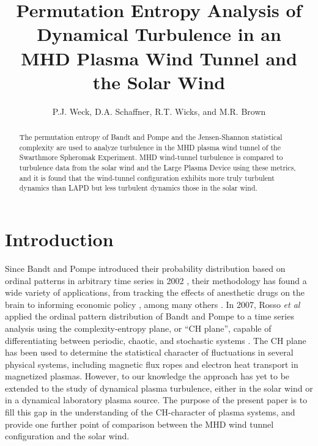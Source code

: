 \documentclass[aps,twocolumn,secnumarabic,nobalancelastpage,amsmath,amssymb,
nofootinbib]{revtex4-1}
\begin{document}
\title{Permutation Entropy Analysis of Dynamical Turbulence in an  \\MHD Plasma Wind Tunnel and the Solar Wind}
\author{P.J. Weck, D.A. Schaffner, R.T. Wicks, and M.R. Brown}
\begin{abstract}
The permutation entropy of Bandt and Pompe and the Jensen-Shannon statistical complexity are used to analyze turbulence in the MHD plasma wind tunnel of the Swarthmore Spheromak Experiment. MHD wind-tunnel turbulence is compared to turbulence data from the solar wind and the Large Plasma Device using these metrics, and it is found that the wind-tunnel configuration exhibits more truly turbulent dynamics than LAPD but less turbulent dynamics those in the solar wind. 
\end{abstract}
\maketitle

\section{Introduction}
Since Bandt and Pompe introduced their probability distribution based on ordinal patterns in arbitrary time series in 2002 \cite{bandt2002}, their methodology has found a wide variety of applications, from tracking the effects of anesthetic drugs on the brain \cite{li2010,jordan2008,olofsen2008} to informing economic policy \cite{bariviera2013,zunino2010,zunino2011}, among many others \cite{kowalski2007,soriano2011,saco2010,suyal2012,sun2010}. In 2007, Rosso \textit{et al} applied the ordinal pattern distribution of Bandt and Pompe to a time series analysis using the complexity-entropy plane, or “CH plane”, capable of differentiating between periodic, chaotic, and stochastic systems \cite{rosso2007}. The CH plane has been used to determine the statistical character of fluctuations in several physical systems, including magnetic flux ropes \cite{gekelman2014} and electron heat transport \cite{maggs2013} in magnetized plasmas. However, to our knowledge the approach has yet to be extended to the study of dynamical plasma turbulence, either in the solar wind or in a dynamical laboratory plasma source. The purpose of the present paper is to fill this gap in the understanding of the CH-character of plasma systems, and provide one further point of comparison between the MHD wind tunnel configuration and the solar wind.
\end{document}
